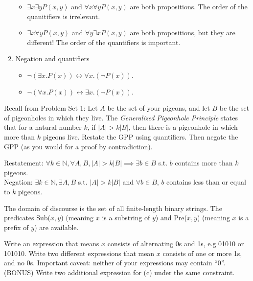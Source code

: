 \documentclass[solution, letterpaper]{cs20inclass}
\begin{document}
\begin{enumerate}
\begin{itemize}
\item $\exists x \exists y P(x,y)$ and $\forall x \forall y P(x,y)$ are both propositions. The order of the quanitifiers is irrelevant.

\item $\exists x \forall y P(x,y)$ and $\forall y \exists x P(x,y)$ are both propositions, but they are different! The order of the quantifiers is important. 

\end{itemize}

\item Negation and quantifiers
\begin{itemize}
\item $\neg (\exists x. P(x)) \leftrightarrow \forall x. (\neg P(x))$.
\item $\neg (\forall x. P(x)) \leftrightarrow \exists x. (\neg P(x))$.

\end{itemize}

\end{enumerate}

\problem Recall from Problem Set 1: Let $A$ be the set of your pigeons, and let $B$ be the set of pigeonholes in which they live. The \textit{Generalized Pigeonhole Principle} states that for a natural number $k$, if $|A| > k|B|$, then there is a pigeonhole in which more than $k$ pigeons live. Restate the GPP using quantifiers. Then negate the GPP (as you would for a proof by contradiction).

\begin{solution}
Restatement:
$\forall k \in \mathbb{N}, \forall A, B, |A| > k|B| \implies \exists b \in B$ s.t. $b$ contains more than $k$ pigeons.\\
Negation:
$\exists k \in \mathbb{N}, \exists A, B$ s.t. $|A| > k|B|$ and $\forall b \in B$, $b$ contains less than or equal to $k$ pigeons.
\end{solution}

\problem
 The domain of discourse is the set of all finite-length binary strings. The predicates Sub($x,y$) (meaning $x$ is a substring of $y$) and Pre($x,y$) (meaning $x$ is a prefix of $y$) are available.

\subproblem  Write an expression that means $x$ consists of alternating 0s and 1s, e.g 01010 or 101010.
\subproblem Write two different expressions that mean $x$ consists of one or more 1s, and no 0s. Important caveat: neither of your expressions may contain ``0''.
\subproblem (BONUS) Write two additional expression for (c) under the same constraint.
\end{document}
